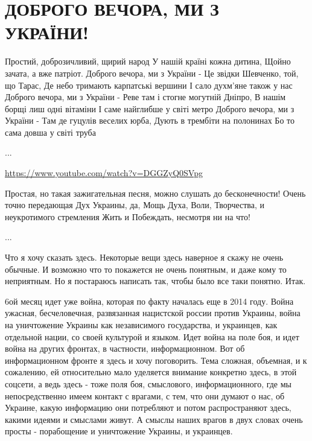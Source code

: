  
 
 
 
 

\section{ДОБРОГО ВЕЧОРА, МИ З УКРАЇНИ!}

\obeycr
Простий, доброзичливий, щирий народ
У нашій країні кожна дитина, 
Щойно зачата, а вже патріот. 
Доброго вечора, ми з України - 
Це звідки Шевченко, той, що Тарас,
Де небо тримають карпатські вершини
І сало духм'яне також у нас 
\smallskip
Доброго вечора, ми з України - 
Реве там і стогне могутній Дніпро,
В нашім борщі лиш одні вітаміни
І саме найглибше у світі метро
Доброго вечора, ми з України -
Там де гуцулів веселих юрба,
Дують в трембіти на полонинах
Бо то сама довша у світі труба
\restorecr

...

\url{https://www.youtube.com/watch?v=DGGZyQ0SVpg}

Простая, но такая зажигательная песня, можно слушать до бесконечности!  Очень
точно передающая Дух Украины, да, Мощь Духа, Воли, Творчества, и неукротимого
стремления Жить и Побеждать, несмотря ни на что!

...

Что я хочу сказать здесь. Некоторые вещи здесь наверное я скажу не очень
обычные.  И возможно что то покажется не очень понятным, и даже кому то
неприятным.  Но я постараюсь написать так, чтобы было все таки понятно. Итак. 

6ой месяц идет уже война, которая по факту началась еще в 2014 году. Война
ужасная, бесчеловечная, развязанная нацистской россии против Украины, война на
уничтожение Украины как независимого государства, и украинцев, как отдельной
нации, со своей культурой и языком.  Идет война на поле боя, и идет война на
других фронтах, в частности, информационном. Вот об информационном фронте я
здесь и хочу поговорить. Тема сложная, объемная, и к сожалению, ей относительно
мало уделяется внимание конкретно здесь, в этой соцсети, а ведь здесь - тоже
поля боя, смыслового, информационного, где мы непосредственно имеем контакт с
врагами, с тем, что они думают о нас, об Украине, какую информацию они
потребляют и потом распространяют здесь, какими идеями и смыслами живут. А
смыслы наших врагов в двух словах очень просты - порабощение и уничтожение
Украины, и украинцев.

